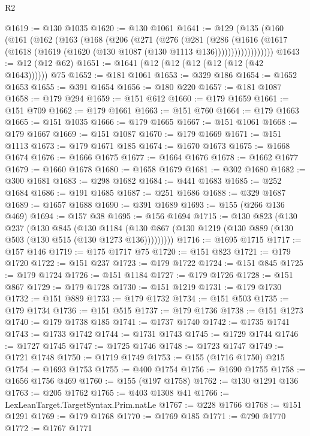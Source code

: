 \begin{lexlean}{R2}
\begin{coremodule}
@1619 := @130 @1035
@1620 := @130 @1061
@1641 := @129
    (@135
      (@160
        (@161
          (@162
            (@163
              (@168
                (@206
                  (@271
                    (@276
                      (@281
                        (@286
                          (@1616
                            (@1617
                              (@1618 (@1619 (@1620 (@130 @1087 (@130 @1113 @136))))))))))))))))))
@1643 := @12 (@12 @62)
@1651 := @1641 (@12 (@12 (@12 (@12 (@12 (@42 @1643)))))) @75
@1652 := @181 @1061
@1653 := @329 @186
@1654 := @1652 @1653
@1655 := @391 @1654
@1656 := @180 @220
@1657 := @181 @1087
@1658 := @179 @294
@1659 := @151 @612
@1660 := @179 @1659
@1661 := @151 @709
@1662 := @179 @1661
@1663 := @151 @760
@1664 := @179 @1663
@1665 := @151 @1035
@1666 := @179 @1665
@1667 := @151 @1061
@1668 := @179 @1667
@1669 := @151 @1087
@1670 := @179 @1669
@1671 := @151 @1113
@1673 := @179 @1671 @185
@1674 := @1670 @1673
@1675 := @1668 @1674
@1676 := @1666 @1675
@1677 := @1664 @1676
@1678 := @1662 @1677
@1679 := @1660 @1678
@1680 := @1658 @1679
@1681 := @302 @1680
@1682 := @300 @1681
@1683 := @298 @1682
@1684 := @441 @1683
@1685 := @252 @1684
@1686 := @191 @1685
@1687 := @251 @1686
@1688 := @329 @1687
@1689 := @1657 @1688
@1690 := @391 @1689
@1693 := @155 (@266 @136 @469)
@1694 := @157 @38
@1695 := @156 @1694
@1715 := @130
    @823
    (@130
      @237
      (@130
        @845
        (@130
          @1184
          (@130 @867 (@130 @1219 (@130 @889 (@130 @503 (@130 @515 (@130 @1273 @136)))))))))
@1716 := @1695 @1715
@1717 := @157 @146
@1719 := @175 @1717 @75
@1720 := @151 @823
@1721 := @179 @1720
@1722 := @151 @237
@1723 := @179 @1722
@1724 := @151 @845
@1725 := @179 @1724
@1726 := @151 @1184
@1727 := @179 @1726
@1728 := @151 @867
@1729 := @179 @1728
@1730 := @151 @1219
@1731 := @179 @1730
@1732 := @151 @889
@1733 := @179 @1732
@1734 := @151 @503
@1735 := @179 @1734
@1736 := @151 @515
@1737 := @179 @1736
@1738 := @151 @1273
@1740 := @179 @1738 @185
@1741 := @1737 @1740
@1742 := @1735 @1741
@1743 := @1733 @1742
@1744 := @1731 @1743
@1745 := @1729 @1744
@1746 := @1727 @1745
@1747 := @1725 @1746
@1748 := @1723 @1747
@1749 := @1721 @1748
@1750 := @1719 @1749
@1753 := @155 (@1716 @1750) @215
@1754 := @1693 @1753
@1755 := @400 @1754
@1756 := @1690 @1755
@1758 := @1656 @1756 @469
@1760 := @155 (@197 @1758)
@1762 := @130 @1291 @136
@1763 := @205 @1762
@1765 := @403 @1308 @41
@1766 := LexLeanTarget.TargetSyntax.Prim.natLe
@1767 := @228 @1766
@1768 := @151 @1291
@1769 := @179 @1768
@1770 := @1769 @185
@1771 := @790 @1770
@1772 := @1767 @1771

\end{coremodule}
\end{lexlean}

